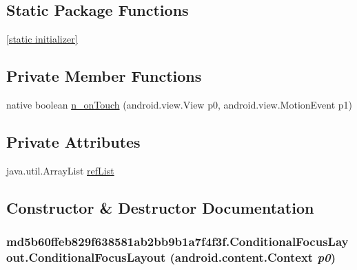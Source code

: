 \subsection*{Static Package Functions}
\begin{CompactItemize}
\item 
\hyperlink{classmd5b60ffeb829f638581ab2bb9b1a7f4f3f_1_1_conditional_focus_layout_c37f097e718f5a563db54d12247bb918}{\mbox{[}static initializer\mbox{]}}
\end{CompactItemize}
\subsection*{Private Member Functions}
\begin{CompactItemize}
\item 
native boolean \hyperlink{classmd5b60ffeb829f638581ab2bb9b1a7f4f3f_1_1_conditional_focus_layout_ea86f4bf8bf09bc69ae8979eeaf200dc}{n\_\-onTouch} (android.view.View p0, android.view.MotionEvent p1)
\end{CompactItemize}
\subsection*{Private Attributes}
\begin{CompactItemize}
\item 
java.util.ArrayList \hyperlink{classmd5b60ffeb829f638581ab2bb9b1a7f4f3f_1_1_conditional_focus_layout_93bb5d893a06572803a3b5c221292fdc}{refList}
\end{CompactItemize}


\subsection{Constructor \& Destructor Documentation}
\hypertarget{classmd5b60ffeb829f638581ab2bb9b1a7f4f3f_1_1_conditional_focus_layout_b571a4b93e045a68fdbd705da07026b3}{
\subsubsection[{ConditionalFocusLayout}]{\setlength{\rightskip}{0pt plus 5cm}md5b60ffeb829f638581ab2bb9b1a7f4f3f.ConditionalFocusLayout.ConditionalFocusLayout (android.content.Context {\em p0})}}
\label{classmd5b60ffeb829f638581ab2bb9b1a7f4f3f_1_1_conditional_focus_layout_b571a4b93e045a68fdbd705da07026b3}


